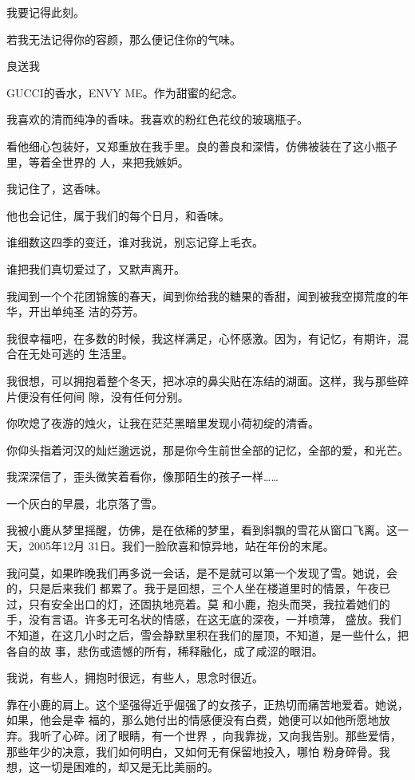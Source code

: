 \documentclass[12pt,a4paper]{article}
\def\blankrev{\vspace{1ex}}									%
\begin{document}
		我要记得此刻。

		若我无法记得你的容颜，那么便记住你的气味。

		良送我

		GUCCI的香水，ENVY ME。作为甜蜜的纪念。\par
		我喜欢的清而纯净的香味。我喜欢的粉红色花纹的玻璃瓶子。

		看他细心包装好，又郑重放在我手里。良的善良和深情，仿佛被装在了这小瓶子里，等着全世界的
	人，来把我嫉妒。

		我记住了，这香味。\par
		他也会记住，属于我们的每个日月，和香味。\par
		谁细数这四季的变迁，谁对我说，别忘记穿上毛衣。\par
		谁把我们真切爱过了，又默声离开。

		\blankrev
		我闻到一个个花团锦簇的春天，闻到你给我的糖果的香甜，闻到被我空掷荒度的年华，开出单纯圣
	洁的芬芳。

		我很幸福吧，在多数的时候，我这样满足，心怀感激。因为，有记忆，有期许，混合在无处可逃的
	生活里。

		我很想，可以拥抱着整个冬天，把冰凉的鼻尖贴在冻结的湖面。这样，我与那些碎片便没有任何间
	隙，没有任何分别。

		\blankrev
		你吹熄了夜游的烛火，让我在茫茫黑暗里发现小荷初绽的清香。\par
		你仰头指着河汉的灿烂邈远说，那是你今生前世全部的记忆，全部的爱，和光芒。\par
		我深深信了，歪头微笑着看你，像那陌生的孩子一样……

	\endwriting



		一个灰白的早晨，北京落了雪。

		我被小鹿从梦里摇醒，仿佛，是在依稀的梦里，看到斜飘的雪花从窗口飞离。这一天，2005年12月
	31日。我们一脸欣喜和惊异地，站在年份的末尾。


		我问莫，如果昨晚我们再多说一会话，是不是就可以第一个发现了雪。她说，会的，只是后来我们
	都累了。我于是回想，三个人坐在楼道里时的情景，午夜已过，只有安全出口的灯，还固执地亮着。莫
	和小鹿，抱头而哭，我拉着她们的手，没有言语。许多无可名状的情感，在这无底的深夜，一并喷薄，
	盛放。我们不知道，在这几小时之后，雪会静默里积在我们的屋顶，不知道，是一些什么，把各自的故
	事，悲伤或遗憾的所有，稀释融化，成了咸涩的眼泪。


		我说，有些人，拥抱时很远，有些人，思念时很近。

		靠在小鹿的肩上。这个坚强得近乎倔强了的女孩子，正热切而痛苦地爱着。她说，如果，他会是幸
	福的，那么她付出的情感便没有白费，她便可以如他所愿地放弃。我听了心碎。闭了眼睛，有一个世界
	，向我靠拢，又向我告别。那些爱情，那些年少的决意，我们如何明白，又如何无有保留地投入，哪怕
	粉身碎骨。我想，这一切是困难的，却又是无比美丽的。
\end{document}
